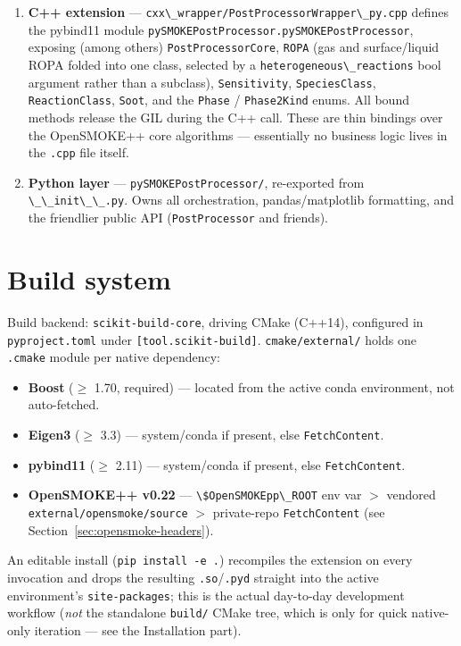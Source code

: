\documentclass[11pt,a4paper]{report}
\newcommand{\pkg}[1]{\lstinline|#1|}
\begin{document}
\begin{enumerate}
\item \textbf{C++ extension} --- \pkg{cxx\_wrapper/PostProcessorWrapper\_py.cpp}
  defines the pybind11 module \pkg{pySMOKEPostProcessor.pySMOKEPostProcessor},
  exposing (among others) \pkg{PostProcessorCore}, \pkg{ROPA} (gas and
  surface/liquid ROPA folded into one class, selected by a
  \pkg{heterogeneous\_reactions} bool argument rather than a subclass),
  \pkg{Sensitivity}, \pkg{SpeciesClass}, \pkg{ReactionClass}, \pkg{Soot}, and
  the \pkg{Phase} / \pkg{Phase2Kind} enums. All bound methods release the
  GIL during the C++ call. These are thin bindings over the OpenSMOKE++ core
  algorithms --- essentially no business logic lives in the \pkg{.cpp} file
  itself.
\item \textbf{Python layer} --- \pkg{pySMOKEPostProcessor/}, re-exported from
  \pkg{\_\_init\_\_.py}. Owns all orchestration, pandas/matplotlib
  formatting, and the friendlier public API (\pkg{PostProcessor} and
  friends).
\end{enumerate}

\chapter{Build system}

Build backend: \pkg{scikit-build-core}, driving CMake (C++14), configured in
\pkg{pyproject.toml} under \pkg{[tool.scikit-build]}. \pkg{cmake/external/}
holds one \pkg{.cmake} module per native dependency:

\begin{itemize}
\item \textbf{Boost} ($\geq$ 1.70, required) --- located from the active
  conda environment, not auto-fetched.
\item \textbf{Eigen3} ($\geq$ 3.3) --- system/conda if present, else
  \pkg{FetchContent}.
\item \textbf{pybind11} ($\geq$ 2.11) --- system/conda if present, else
  \pkg{FetchContent}.
\item \textbf{OpenSMOKE++ v0.22} --- \pkg{\$OpenSMOKEpp\_ROOT} env var $>$
  vendored \pkg{external/opensmoke/source} $>$ private-repo
  \pkg{FetchContent} (see Section~\ref{sec:opensmoke-headers}).
\end{itemize}

An editable install (\pkg{pip install -e .}) recompiles the extension on
every invocation and drops the resulting \pkg{.so}/\pkg{.pyd} straight into
the active environment's \pkg{site-packages}; this is the actual day-to-day
development workflow (\emph{not} the standalone \pkg{build/} CMake tree,
which is only for quick native-only iteration --- see the Installation
part).
\end{document}
